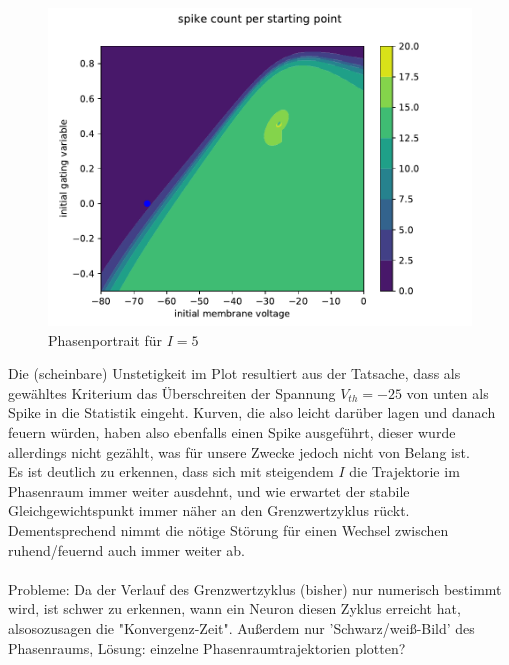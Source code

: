 \documentclass[12pt,a4paper]{article}
\begin{document}
\begin{figure}[H]
\includegraphics[scale=0.9]{contourneu5neu.pdf} 
\caption{Phasenportrait für $I=5$}
\label{pp5}
\end{figure} 
Die (scheinbare) Unstetigkeit im Plot resultiert aus der Tatsache, dass als gewähltes Kriterium das Überschreiten der Spannung $V_{th}=-25$ von unten als Spike in die Statistik eingeht. Kurven, die also leicht darüber lagen und danach feuern würden, haben also ebenfalls einen Spike ausgeführt, dieser wurde allerdings nicht gezählt, was für unsere Zwecke jedoch nicht von Belang ist.\\
Es ist deutlich zu erkennen, dass sich mit steigendem $I$ die Trajektorie im Phasenraum immer weiter ausdehnt, und wie erwartet der stabile Gleichgewichtspunkt immer näher an den Grenzwertzyklus rückt. Dementsprechend nimmt die nötige Störung für einen Wechsel zwischen ruhend/feuernd auch immer weiter ab.
\\\\
Probleme: Da der Verlauf des Grenzwertzyklus (bisher) nur numerisch bestimmt wird, ist schwer zu erkennen, wann ein Neuron diesen Zyklus erreicht hat, alsosozusagen die "Konvergenz-Zeit". Außerdem nur 'Schwarz/weiß-Bild' des Phasenraums, Lösung: einzelne Phasenraumtrajektorien plotten? 
\end{document}
